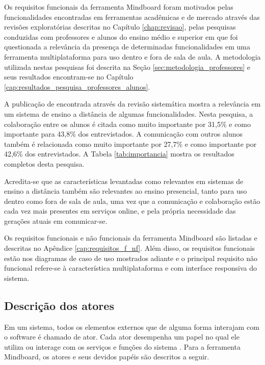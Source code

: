 Os requisitos funcionais da ferramenta Mindboard foram motivados pelas funcionalidades encontradas em ferramentas acadêmicas e de mercado através das revisões exploratórias descritas no Capítulo \ref{chap:revisao}, pelas pesquisas conduzidas com professores e alunos do ensino médio e superior em que foi questionada a relevância da presença de determinadas funcionalidades em uma ferramenta multiplataforma para uso dentro e fora de sala de aula. A metodologia utilizada nestas pesquisas foi descrita na Seção \ref{sec:metodologia_professores} e seus resultados encontram-se no Capítulo \ref{cap:resultados_pesquisa_professores_alunos}. 


A publicação de   encontrada através da revisão sistemática mostra a relevância em um sistema de ensino a distância de algumas funcionalidades. Nesta pesquisa, a colaboração entre os alunos é citada como muito importante por 31,5\% e como importante para 43,8\% dos entrevistados. A comunicação com outros alunos também é relacionada como muito importante por 27,7\% e como importante por 42,6\% dos entrevistados. A Tabela \ref{tab:importancia} mostra os resultados completos desta pesquisa. 

Acredita-se que as características levantadas como relevantes em sistemas de ensino a distância também são relevantes ao ensino presencial, tanto para uso dentro como fora de sala de aula, uma vez que a comunicação e colaboração estão cada vez mais presentes em serviços online, e pela própria necessidade das gerações atuais em comunicar-se.

Os requisitos funcionais e não funcionais da ferramenta Mindboard são listadas e descritas no Apêndice \ref{cap:requisitos_f_nf}. Além disso, os requisitos funcionais estão nos diagramas de caso de uso mostrados adiante e o principal requisito não funcional refere-se à característica multiplataforma e com interface responsiva do sistema.


\subsection{Descrição dos atores}

Em um sistema, todos os elementos externos que de alguma forma interajam com o software é chamado de ator. Cada ator desempenha um papel no qual ele utiliza ou interage com os serviços e funções do sistema \cite{guedes:2009}. Para a ferramenta Mindboard, os atores e seus devidos papéis são descritos a seguir.


